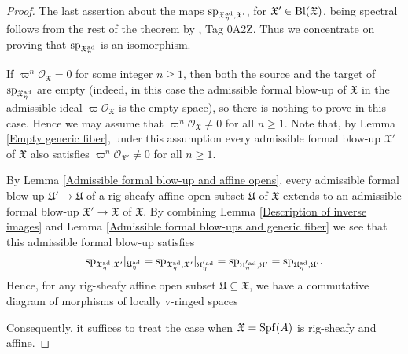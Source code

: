 \documentclass[12pt,twoside,a4paper]{article}
\theoremstyle{definition}
\theoremstyle{remark}
\newcommand\ad{{\rm ad}}
\newcommand\Bl{{\rm Bl}}
\newcommand\spc{{\rm sp}}
\newcommand\Spf{{\rm Spf}}
\begin{document}
\begin{proof}The last assertion about the maps $\spc_{\mathfrak{X}_{\eta}^{\ad},\mathfrak{X}'}$, for $\mathfrak{X}'\in\Bl(\mathfrak{X})$, being spectral follows from the rest of the theorem by \cite{Stacks}, Tag 0A2Z. Thus we concentrate on proving that $\spc_{\mathfrak{X}_{\eta}^{\ad}}$ is an isomorphism.

If $\varpi^{n}\mathcal{O}_{\mathfrak{X}}=0$ for some integer $n\geq1$, then both the source and the target of $\spc_{\mathfrak{X}_{\eta}^{\ad}}$ are empty (indeed, in this case the admissible formal blow-up of $\mathfrak{X}$ in the admissible ideal $\varpi\mathcal{O}_{\mathfrak{X}}$ is the empty space), so there is nothing to prove in this case. Hence we may assume that $\varpi^{n}\mathcal{O}_{\mathfrak{X}}\neq 0$ for all $n\geq1$. Note that, by Lemma \ref{Empty generic fiber}, under this assumption every admissible formal blow-up $\mathfrak{X}'$ of $\mathfrak{X}$ also satisfies $\varpi^{n}\mathcal{O}_{\mathfrak{X}'}\neq 0$ for all $n\geq1$.    

By Lemma \ref{Admissible formal blow-up and affine opens}, every admissible formal blow-up $\mathfrak{U}'\to\mathfrak{U}$ of a rig-sheafy affine open subset $\mathfrak{U}$ of $\mathfrak{X}$ extends to an admissible formal blow-up $\mathfrak{X}'\to\mathfrak{X}$ of $\mathfrak{X}$. By combining Lemma \ref{Description of inverse images} and Lemma \ref{Admissible formal blow-ups and generic fiber} we see that this admissible formal blow-up satisfies\begin{equation*}\spc_{\mathfrak{X}_{\eta}^{\ad},\mathfrak{X}'}\vert_{\mathfrak{U}_{\eta}^{\ad}}=\spc_{\mathfrak{X}_{\eta}^{\ad},\mathfrak{X}'}\vert_{\mathfrak{U}_{\eta}^{'\ad}}=\spc_{\mathfrak{U}_{\eta}^{'\ad},\mathfrak{U}'}=\spc_{\mathfrak{U}_{\eta}^{\ad},\mathfrak{U}'}.\end{equation*}Hence, for any rig-sheafy affine open subset $\mathfrak{U}\subseteq \mathfrak{X}$, we have a commutative diagram of morphisms of locally v-ringed spaces \begin{center}\end{center}Consequently, it suffices to treat the case when $\mathfrak{X}=\Spf(A)$ is rig-sheafy and affine. 


\end{proof}
\end{document}
